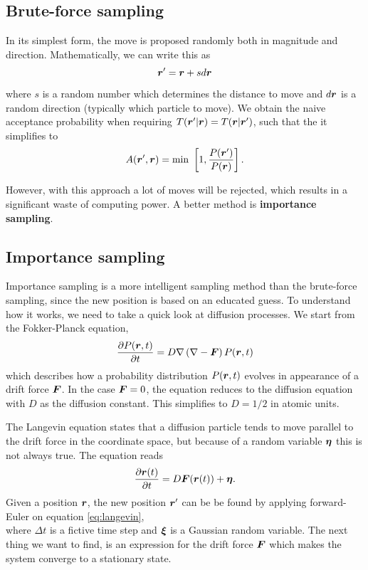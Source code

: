 \subsection{Brute-force sampling}
In its simplest form, the move is proposed randomly both in magnitude and direction. Mathematically, we can write this as
\begin{equation}
\boldsymbol{{r}}'=\boldsymbol{{r}}+sd\boldsymbol{{r}}
\end{equation}
where $s$ is a random number which determines the distance to move and $d\boldsymbol{{r}}$ is a random direction (typically which particle to move). We obtain the naive acceptance probability when requiring $T(\boldsymbol{{r}}'|\boldsymbol{{r}})=T(\boldsymbol{{r}}|\boldsymbol{{r}}')$, such that the it simplifies to
\begin{equation}
A(\boldsymbol{{r}}',\boldsymbol{{r}})=\text{min }\left[1,\frac{P(\boldsymbol{{r}}')}{P(\boldsymbol{{r}})}\right].
\end{equation}

However, with this approach a lot of moves will be rejected, which results in a significant waste of computing power. A better method is \textbf{importance sampling}.

\subsection{Importance sampling} \label{sec:importancesampling}
Importance sampling is a more intelligent sampling method than the brute-force sampling, since the new position is based on an educated guess. To understand how it works, we need to take a quick look at diffusion processes. We start from the Fokker-Planck equation,
\begin{equation}
\frac{\partial P(\boldsymbol{{r}},t)}{\partial t}=D\nabla\left(\nabla-\boldsymbol{{F}}\right)P(\boldsymbol{{r}},t)
\end{equation}
which describes how a probability distribution $P(\boldsymbol{{r}},t)$ evolves in appearance of a drift force $\boldsymbol{{F}}$. In the case $\boldsymbol{{F}}=0$, the equation reduces to the diffusion equation with $D$ as the diffusion constant. This simplifies to $D=1/2$ in atomic units. 

The Langevin equation states that a diffusion particle tends to move parallel to the drift force in the coordinate space, but because of a random variable $\boldsymbol{{\eta}}$ this is not always true. The equation reads
\begin{equation}
\frac{\partial \boldsymbol{{r}}(t)}{\partial t}=D\boldsymbol{{F}}(\boldsymbol{{r}}(t))+\boldsymbol{{\eta}}.
\label{eq:langevin}
\end{equation}
Given a position $\boldsymbol{{r}}$, the new position $\boldsymbol{{r}}'$ can be be found by applying forward-Euler on equation \eqref{eq:langevin},
\begin{equation}
\end{equation}
where $\Delta t$ is a fictive time step and $\boldsymbol{{\xi}}$ is a Gaussian random variable. The next thing we want to find, is an expression for the drift force $\boldsymbol{{F}}$ which makes the system converge to a stationary state. 

